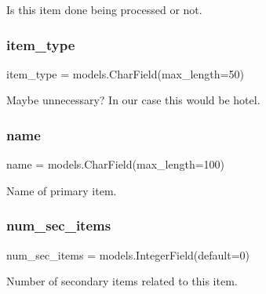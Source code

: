 Is this item done being processed or not. 

\mbox{\label{classjoinapp_1_1models_1_1items_1_1_primary_item_a2679318a14061852e50df3c6e4e42f62}} 
\subsubsection{\texorpdfstring{item\_type}{item\_type}}
{\footnotesize\ttfamily item\+\_\+type = models.\+Char\+Field(max\+\_\+length=50)\hspace{0.3cm}{\ttfamily [static]}}



Maybe unnecessary? In our case this would be hotel. 

\mbox{\label{classjoinapp_1_1models_1_1items_1_1_primary_item_ab74e6bf80237ddc4109968cedc58c151}} 
\subsubsection{\texorpdfstring{name}{name}}
{\footnotesize\ttfamily name = models.\+Char\+Field(max\+\_\+length=100)\hspace{0.3cm}{\ttfamily [static]}}



Name of primary item. 

\mbox{\label{classjoinapp_1_1models_1_1items_1_1_primary_item_a03d74f618037ba767c1bb9424b97dbf3}} 
\subsubsection{\texorpdfstring{num\_sec\_items}{num\_sec\_items}}
{\footnotesize\ttfamily num\+\_\+sec\+\_\+items = models.\+Integer\+Field(default=0)\hspace{0.3cm}{\ttfamily [static]}}



Number of secondary items related to this item. 

